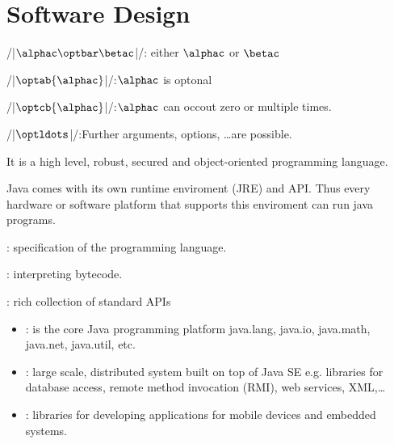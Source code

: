 \section{Software Design}
\begin{sectionbox}\nospacing
  \begin{itemizenosep}
      \item \cppinline[bgcolor=mintinlinebox]/|$\alphac \optbar \betac$|/:\hfil
    either $\alphac$ or $\betac$
      \item \cppinline[bgcolor=mintinlinebox]/|$\optab{\alphac}$|/:\hfil$\alphac$ is optonal
      \item \cppinline[bgcolor=mintinlinebox]/|$\optcb{\alphac}$|/:\hfil$\alphac$ can
    occout zero or multiple times.
      \item \cppinline[bgcolor=mintinlinebox]/|$\optldots$|/:\hfil Further arguments,
    options, \ldots are possible.
  \end{itemizenosep}
\end{sectionbox}
\begin{sectionbox}\nospacing
  \begin{itemizenosep}
    \item It is a high level, robust, secured and object-oriented programming
  language.
    \item Java comes with its own runtime enviroment (JRE) and API.
  Thus every hardware or software platform that supports this enviroment
  can run java programs.
  \end{itemizenosep}
\end{sectionbox}
\begin{sectionbox}\nospacing
  \begin{itemizenosep}
      \item {}: specification of the programming language.
      \item {} : interpreting bytecode.
      \item {}: rich collection of standard APIs
    \begin{itemize}[nolistsep, noitemsep]
        \item {}: is the core Java programming platform
      java.lang, java.io, java.math, java.net, java.util, etc.
        \item {}: large scale, distributed system
      built on top of Java SE e.g. libraries for database access, remote method invocation (RMI), web services, XML,\ldots
        \item {}: libraries for developing applications for mobile devices and embedded systems.
    \end{itemize}
  \end{itemizenosep}
\end{sectionbox}
